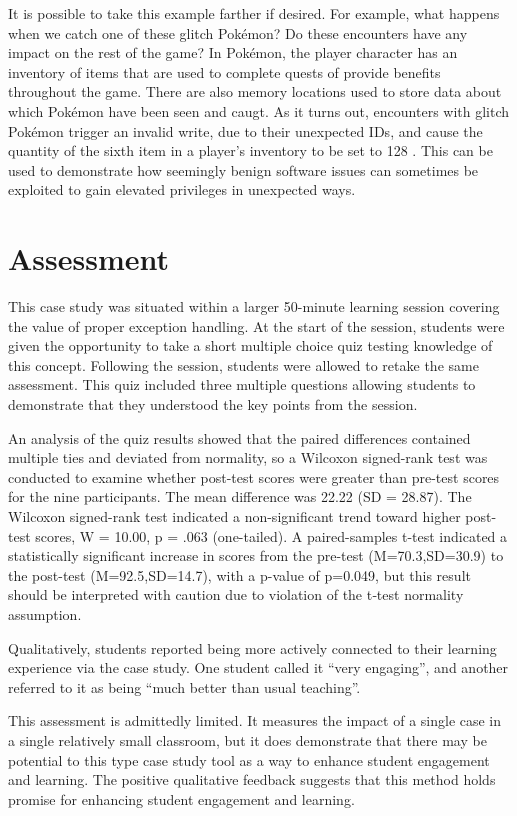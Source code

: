 \documentclass[letterpaper]{article}
\begin{document}
It is possible to take this example farther if desired. For example, what happens when we catch one of these glitch Pokémon? Do these encounters have any impact on the rest of the game? In Pokémon, the player character has an inventory of items that are used to complete quests of provide benefits throughout the game. There are also memory locations used to store data about which Pokémon have been seen and caugt. As it turns out, encounters with glitch Pokémon trigger an invalid write, due to their unexpected IDs, and cause the quantity of the sixth item in a player's inventory to be set to 128 \cite{bulbapedia2010}. This can be used to demonstrate how seemingly benign software issues can sometimes be exploited to gain elevated privileges in unexpected ways.

\section{Assessment}
This case study was situated within a larger 50-minute learning session covering the value of proper exception handling. At the start of the session, students were given the opportunity to take a short multiple choice quiz testing knowledge of this concept. Following the session, students were allowed to retake the same assessment. This quiz included three multiple questions allowing students to demonstrate that they understood the key points from the session.

An analysis of the quiz results showed that the paired differences contained multiple ties and deviated from normality, so a Wilcoxon signed-rank test was conducted to examine whether post-test scores were greater than pre-test scores for the nine participants. The mean difference was 22.22 (SD = 28.87). The Wilcoxon signed-rank test indicated a non-significant trend toward higher post-test scores, W = 10.00, p = .063 (one-tailed). A paired-samples t-test indicated a statistically significant increase in scores from the pre-test (M=70.3,SD=30.9) to the post-test (M=92.5,SD=14.7), with a p-value of p=0.049, but this result should be interpreted with caution due to violation of the t‑test normality assumption.

Qualitatively, students reported being more actively connected to their learning experience via the case study. One student called it ``very engaging'', and another referred to it as being ``much better than usual teaching''.

This assessment is admittedly limited. It measures the impact of a single case in a single relatively small classroom, but it does demonstrate that there may be potential to this type case study tool as a way to enhance student engagement and learning. The positive qualitative feedback suggests that this method holds promise for enhancing student engagement and learning.
\end{document}

